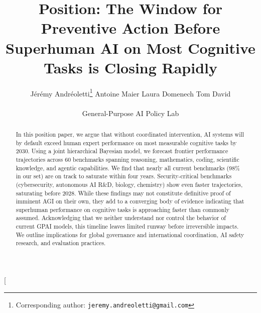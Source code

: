 \documentclass[letterpaper,twocolumn]{article}
\begin{document}
\title{Position: The Window for Preventive Action Before Superhuman AI on Most Cognitive Tasks is Closing Rapidly}

\author{
  Jérémy Andréoletti\thanks{Corresponding author: \texttt{jeremy.andreoletti@gmail.com}} \quad
  Antoine Maier \quad
  Laura Domenech \quad
  Tom David \\
  \\
  General-Purpose AI Policy Lab
}

\date{}

\twocolumn[
\maketitle

\begin{abstract}
In this position paper, we argue that without coordinated intervention, AI systems will by default exceed human expert performance on most measurable cognitive tasks by 2030.
Using a joint hierarchical Bayesian model, we forecast frontier performance trajectories across 60 benchmarks spanning reasoning, mathematics, coding, scientific knowledge, and agentic capabilities. We find that nearly all current benchmarks (98\% in our set) are on track to saturate within four years.
Security-critical benchmarks (cybersecurity, autonomous AI R\&D, biology, chemistry) show even faster trajectories, saturating before 2028.
While these findings may not constitute definitive proof of imminent AGI on their own, they add to a converging body of evidence indicating that superhuman performance on cognitive tasks is approaching faster than commonly assumed. Acknowledging that we neither understand nor control the behavior of current GPAI models, this timeline leaves limited runway before irreversible impacts. We outline implications for global governance and international coordination, AI safety research, and evaluation practices.


\end{abstract}
\end{document}
